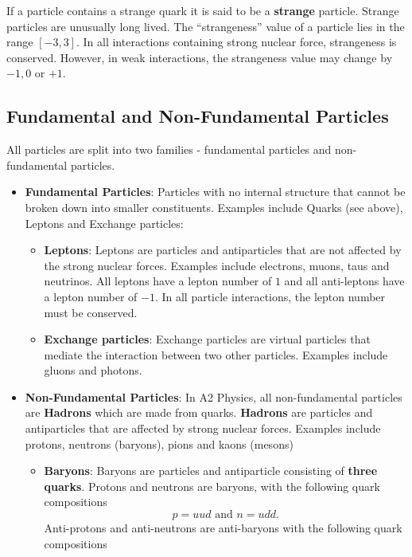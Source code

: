 If a particle contains a strange quark it is said to be a \textbf{strange} particle. Strange particles are unusually long lived. The ``strangeness'' value of a particle lies in the range $[-3, 3]$. In all interactions containing strong nuclear force, strangeness is conserved. However, in weak interactions, the strangeness value may change by $-1, 0$ or $+1$. 

\subsection{Fundamental and Non-Fundamental Particles}

\noindent All particles are split into two families - fundamental particles and non-fundamental particles. 
\begin{itemize}
    \item \textbf{Fundamental Particles}: Particles with no internal structure that cannot be broken down into smaller constituents. Examples include Quarks (see above), Leptons and Exchange particles:
    \begin{itemize}
        \item \textbf{Leptons}: Leptons are particles and antiparticles that are not affected by the strong nuclear forces. Examples include electrons, muons, taus and neutrinos. All leptons have a lepton number of $1$ and all anti-leptons have a lepton number of $-1$. In all particle interactions, the lepton number must be conserved.  
        \item \textbf{Exchange particles}: Exchange particles are virtual particles that mediate the interaction between two other particles. Examples include gluons and photons. 
    \end{itemize}
    \item \textbf{Non-Fundamental Particles}: In A2 Physics, all non-fundamental particles are \textbf{Hadrons} which are made from quarks. \textbf{Hadrons} are particles and antiparticles that are affected by strong nuclear forces. Examples include protons, neutrons (baryons), pions and kaons (mesons)
    \begin{itemize}
        \item \textbf{Baryons}: Baryons are particles and antiparticle consisting of \textbf{three quarks}. Protons and neutrons are baryons, with the following quark compositions 
        \begin{equation*}
            p = uud \text{ and } n = udd.
        \end{equation*}
        Anti-protons and anti-neutrons are anti-baryons with the following quark compositions

\end{itemize}
\end{itemize}
